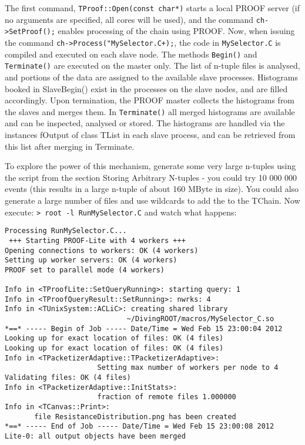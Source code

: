 \documentclass{article}
\begin{document}
The first command, \texttt{TProof::Open(const\ char*)} starts a local
PROOF server (if no arguments are specified, all cores will be used),
and the command \texttt{ch-\textgreater{}SetProof();} enables processing
of the chain using PROOF. Now, when issuing the command
\texttt{ch-\textgreater{}Process("MySelector.C+);}, the code in
\texttt{MySelector.C} is compiled and executed on each slave node. The
methods \texttt{Begin()} and \texttt{Terminate()} are executed on the
master only. The list of n-tuple files is analysed, and portions of the
data are assigned to the available slave processes. Histograms booked in
SlaveBegin() exist in the processes on the slave nodes, and are filled
accordingly. Upon termination, the PROOF master collects the histograms
from the slaves and merges them. In \texttt{Terminate()} all merged
histograms are available and can be inspected, analysed or stored. The
histograms are handled via the instances fOutput of class TList in each
slave process, and can be retrieved from this list after merging in
Terminate.

To explore the power of this mechanism, generate some very large
n-tuples using the script from the section Storing Arbitrary N-tuples -
you could try 10 000 000 events (this results in a large n-tuple of
about 160 MByte in size). You could also generate a large number of
files and use wildcards to add the to the TChain. Now execute:
\texttt{\textgreater{}\ root\ -l\ RunMySelector.C} and watch what
happens:

\begin{verbatim}
Processing RunMySelector.C...
 +++ Starting PROOF-Lite with 4 workers +++
Opening connections to workers: OK (4 workers)
Setting up worker servers: OK (4 workers)
PROOF set to parallel mode (4 workers)

Info in <TProofLite::SetQueryRunning>: starting query: 1
Info in <TProofQueryResult::SetRunning>: nwrks: 4
Info in <TUnixSystem::ACLiC>: creating shared library
                             ~/DivingROOT/macros/MySelector_C.so
*==* ----- Begin of Job ----- Date/Time = Wed Feb 15 23:00:04 2012
Looking up for exact location of files: OK (4 files)
Looking up for exact location of files: OK (4 files)
Info in <TPacketizerAdaptive::TPacketizerAdaptive>:
                      Setting max number of workers per node to 4
Validating files: OK (4 files)
Info in <TPacketizerAdaptive::InitStats>:
                      fraction of remote files 1.000000
Info in <TCanvas::Print>:
       file ResistanceDistribution.png has been created
*==* ----- End of Job ----- Date/Time = Wed Feb 15 23:00:08 2012
Lite-0: all output objects have been merged
\end{verbatim}
\end{document}
